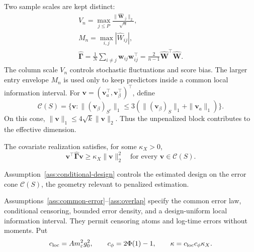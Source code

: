 Two sample scales are kept distinct:
\begin{equation}
 \begin{gathered}
V_n=\max_{j\le P}\frac{\|\widehat{\bm{W}}_{\cdot j}\|_2}{\sqrt n},\\
 M_n=\max_{i,j}|\widehat W_{ij}|,\\
 \widehat{\bm{\Gamma}}=\frac1N\sum_{i\ne j}\bm{w}_{ij}\bm{w}_{ij}^\top
               =\frac{2}{n-1}\widehat{\bm{W}}^\top\widehat{\bm{W}}.
 \end{gathered}
 \label{eq:theory-scales}
\end{equation}
The column scale $V_n$ controls stochastic fluctuations and score bias. The larger entry envelope $M_n$ is used only to keep predictors inside a common local information interval.
For $\bm{v}=(\bm{v}_a^\top,\bm{v}_\beta^\top)^\top$, define
\begin{equation}
 \mathcal C(S)=\{\bm{v}:\|(\bm{v}_\beta)_{S^c}\|_1
          \le3(\|(\bm{v}_\beta)_S\|_1+\|\bm{v}_a\|_1)\}.
 \label{eq:theory-cone}
\end{equation}
On this cone, $\|\bm{v}\|_1\le4\sqrt{k}\|\bm{v}\|_2$. Thus the unpenalized block contributes to the effective dimension.

\begin{assumption}
\label{ass:conditional-design}
The covariate realization satisfies, for some $\kappa_X>0$,
\begin{equation}
 \bm{v}^\top\widehat{\bm{\Gamma}} \bm{v}\ge\kappa_X\|\bm{v}\|_2^2
 \quad\text{for every }\bm{v}\in\mathcal C(S).
 \label{eq:conditional-re}
\end{equation}
\end{assumption}
Assumption~\ref{ass:conditional-design} controls the estimated design on the error cone $\mathcal C(S)$, the geometry relevant to penalized estimation.

Assumptions~\ref{ass:common-error}--\ref{ass:overlap} specify the common error law, conditional censoring, bounded error density, and a design-uniform local information interval. They permit censoring atoms and log-time errors without moments. Put
\begin{equation}
 c_{\rm loc}=A m_\varepsilon^2g_0^2,\qquad
 c_\phi=2\Phi(1)-1,\qquad
 \kappa=c_{\rm loc}c_\phi\kappa_X.
 \label{eq:theory-curvature-constants}
\end{equation}

